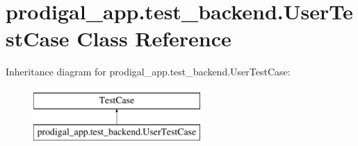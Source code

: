 \hypertarget{classprodigal__app_1_1test__backend_1_1_user_test_case}{}\section{prodigal\+\_\+app.\+test\+\_\+backend.\+User\+Test\+Case Class Reference}
\label{classprodigal__app_1_1test__backend_1_1_user_test_case}
Inheritance diagram for prodigal\+\_\+app.\+test\+\_\+backend.\+User\+Test\+Case\+:\begin{figure}[H]
\begin{center}
\leavevmode
\includegraphics[height=2.000000cm]{classprodigal__app_1_1test__backend_1_1_user_test_case}
\end{center}
\end{figure}
